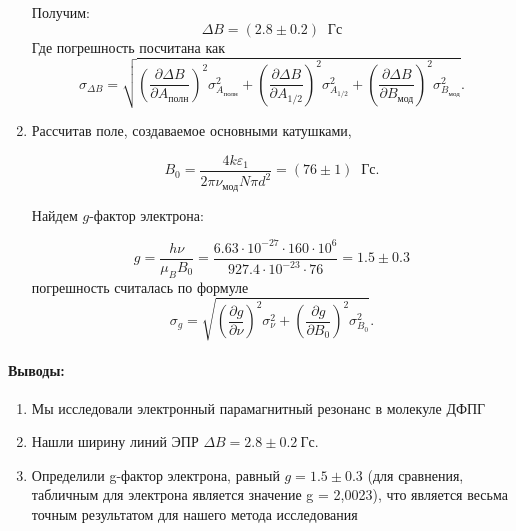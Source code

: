 \documentclass[a4paper,12pt]{article}
\begin{document}
\begin{enumerate}
		
Получим:
$$\Delta B =(2.8\pm 0.2)\;\;\text{Гс}$$
	Где погрешность посчитана как 	
	\[\sigma_{\Delta B} = \sqrt{ \left(\dfrac{\partial \Delta B}{\partial A_{\text{полн}}} \right)^2 \sigma^2_{A_{\text{полн}}} +  \left(\dfrac{\partial \Delta B}{\partial A_{\text{1/2}}} \right)^2 \sigma^2_{A_{\text{1/2}}} + \left(\dfrac{\partial \Delta B}{\partial B_{\text{мод}}} \right)^2 \sigma^2_{B_{\text{мод}}} }.\]
	\item Рассчитав поле, создаваемое основными катушками,
		
		\begin{equation*}
		    B_0 = \frac{4 k\varepsilon_1}{2\pi\nu_{\text{мод}} N \pi d^2} = (76 \pm 1) \;\;\text{Гс}.
		\end{equation*}
		
		Найдем $g$-фактор электрона:
		
		\begin{equation*}
			g = \frac{h\nu}{\mu_BB_0} = \frac{6.63\cdot 10^{-27}\cdot 160\cdot 10^{6}}{927.4\cdot 10^{-23}\cdot 76} = 1.5 \pm 0.3
		\end{equation*}
погрешность считалась по формуле
\[\sigma_g = \sqrt{ \left( \dfrac{\partial g}{\partial \nu}\right)^2 \sigma_{\nu}^2 + \left( \dfrac{\partial g}{\partial B_0}\right)^2 \sigma_{B_0}^2}.\]		
\end{enumerate}
\paragraph{Выводы:}
\begin{enumerate}
\item Мы исследовали электронный парамагнитный резонанс в молекуле ДФПГ
\item Нашли ширину линий ЭПР $\Delta B = 2.8 \pm 0.2~\text{Гс}$.
\item Определили g-фактор электрона, равный $g = 1.5 \pm 0.3$ (для сравнения, табличным для электрона является значение g = 2,0023), что является весьма точным результатом для нашего метода исследования
\end{enumerate}
\end{document}

